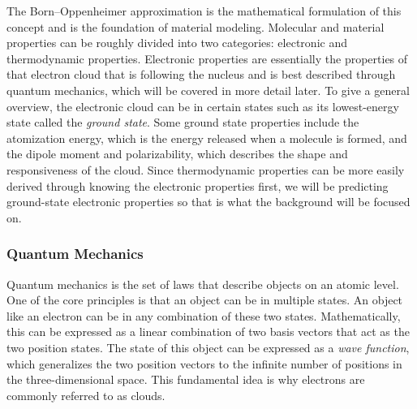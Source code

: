 \documentclass[12pt, abstract = true]{scrartcl}
\begin{document}
The Born–Oppenheimer approximation is the mathematical formulation of this concept and 
is the foundation of material modeling. Molecular and material properties can be 
roughly divided into two categories: electronic and thermodynamic properties. Electronic 
properties are essentially the properties of that electron cloud that is following the 
nucleus and is best described through quantum mechanics, which will be covered in more 
detail later. To give a general overview, the electronic cloud can be in certain states 
such as its lowest-energy state called the \emph{ground state}. Some ground state properties include the atomization energy, which is the energy released when a molecule is formed, and the 
dipole moment and polarizability, which describes the shape and responsiveness of the
cloud. Since thermodynamic properties can be more easily derived through knowing the electronic 
properties first, we will be predicting ground-state electronic properties 
so that is what the background will be focused on. 


\subsubsection{Quantum Mechanics}
Quantum mechanics is the set of laws that describe objects on an atomic level. One of the core
principles is that an object can be in multiple states. An object like an electron can be in any 
combination of these two states. Mathematically, this can be expressed as a linear combination of 
two basis vectors that act as the two position states. The state of this object can be expressed 
as a \emph{wave function}, which generalizes the two position vectors to the infinite number of 
positions in the three-dimensional space. This fundamental idea is why electrons are commonly 
referred to as clouds.
\end{document}
